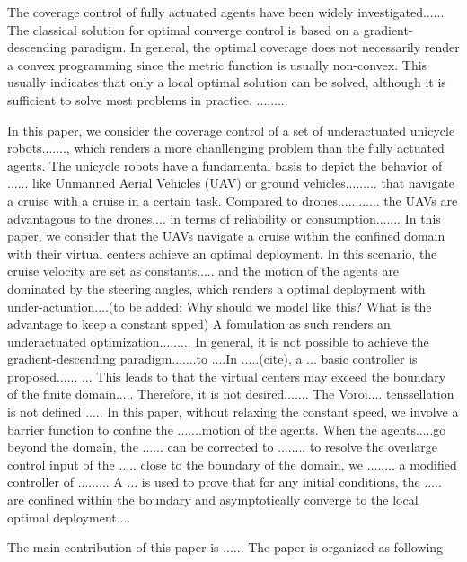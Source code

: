 \documentclass[journal]{IEEEtran}
\begin{document}
The coverage control of fully actuated agents have been widely investigated......
The classical solution for optimal converge control is based on a gradient-descending paradigm.
In general, the optimal coverage does not necessarily render a convex programming since the metric function is usually non-convex. This usually indicates that only a local optimal solution can be solved, although it is sufficient to solve most problems in practice. .........


In this paper, we consider the coverage control of a set of underactuated unicycle robots......., which renders a more chanllenging problem than the fully actuated agents. The unicycle robots have a fundamental basis to depict the behavior of ...... like Unmanned Aerial Vehicles (UAV) or ground vehicles......... that navigate a cruise with a cruise in a certain task. Compared to drones............ the UAVs are advantagous to the drones.... in terms of reliability or consumption....... In this paper, we consider that the UAVs navigate a cruise within the confined domain with their virtual centers achieve an optimal deployment. In this scenario, the cruise velocity are set as constants..... and the motion of the agents are dominated by the steering angles, which renders a optimal deployment with under-actuation....({\color{red}to be added: Why should we model like this? What is the advantage to keep a constant spped}) A fomulation as such renders an underactuated optimization......... In general, it is not possible to achieve the gradient-descending paradigm.......to ....In .....(cite), a ... basic controller is proposed......  ... This leads to that the virtual centers may exceed the boundary of the finite domain..... Therefore, it is not desired....... The Voroi.... tenssellation is not defined ..... In this paper, without relaxing the constant speed, we involve a barrier function to confine the .......motion of the agents. When the agents.....go beyond the domain, the ...... can be corrected to ........ to resolve the overlarge control input of the ..... close to the boundary of the domain, we ........ a modified controller of ......... A ... is used to prove that for any initial conditions, the ..... are confined within the boundary and asymptotically converge to the local optimal deployment....


The main contribution of this paper is ...... The paper is organized as following


\end{document}
